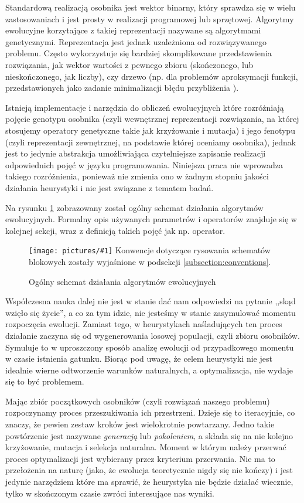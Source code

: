 \documentclass[twoside]{iisthesis}
\newcommand{\img}[1]{\texttt{[image: pictures/\#1]}}
\begin{document}
Standardową realizacją osobnika jest wektor binarny, który sprawdza się w wielu zastosowaniach i jest prosty w realizacji programowej lub sprzętowej. 
Algorytmy ewolucyjne korzytające z takiej reprezentacji nazywane są algorytmami genetycznymi. 
Reprezentacja jest jednak uzależniona od rozwiązywanego problemu. 
Często wykorzystuje się bardziej skomplikowane przedstawienia rozwiązania, jak wektor wartości z pewnego zbioru (skończonego, lub nieskończonego, jak liczby), czy drzewo \cite{gen_prog} (np. dla problemów aproksymacji funkcji, przedstawionych jako zadanie minimalizacji błędu przybliżenia \cite{gen_prog_foo_approx}).

Istnieją implementacje i narzędzia do obliczeń ewolucyjnych które rozróżniają pojęcie genotypu osobnika (czyli wewnętrznej reprezentacji rozwiązania, na której stosujemy operatory genetyczne takie jak krzyżowanie i mutacja) i jego fenotypu (czyli reprezentacji zewnętrznej, na podstawie której oceniamy osobnika), jednak jest to jedynie abstrakcja umożliwiająca czytelniejsze zapisanie realizacji odpowiednich pojęć w języku programowania. Niniejsza praca nie wprowadza takiego rozróżnienia, ponieważ nie zmienia ono w żadnym stopniu jakości działania heurystyki i nie jest związane z tematem badań.

Na rysunku \ref{figure:ea_general} zobrazowany został ogólny schemat działania algorytmów ewolucyjnych. Formalny opis używanych parametrów i operatorów znajduje się w kolejnej sekcji, wraz z definicją takich pojęć jak np. operator.

\begin{figure}
	\caption{Ogólny schemat działania algorytmów ewolucyjnych
		\label{figure:ea_general}
		}
	\img{ea_general.png}
	Konwencje dotyczące rysowania schematów blokowych zostały wyjaśnione w podsekcji \ref{subsection:conventions}.
\end{figure}

Współczesna nauka dalej nie jest w stanie dać nam odpowiedzi na pytanie ,,skąd wzięło się życie'', a co za tym idzie, nie jesteśmy w stanie zasymulować momentu rozpoczęcia ewolucji.
Zamiast tego, w heurystykach naśladujących ten proces działanie zaczyna się od wygenerowania losowej populacji, czyli zbioru osobników. 
Symuluje to w uproszczony sposób analizę ewolucji od przypadkowego momentu w czasie istnienia gatunku.
Biorąc pod uwagę, że celem heurystyki nie jest idealnie wierne odtworzenie warunków naturalnych, a optymalizacja, nie wydaje się to być problemem.

Mając zbiór początkowych osobników (czyli rozwiązań naszego problemu) rozpoczynamy proces przeszukiwania ich przestrzeni.
Dzieje się to iteracyjnie, co znaczy, że pewien zestaw kroków jest wielokrotnie powtarzany.
Jedno takie powtórzenie jest nazywane \emph{generacją} lub \emph{pokoleniem}, a składa się na nie kolejno krzyżowanie, mutacja i selekcja naturalna.
Moment w którym należy przerwać proces optymalizacji jest wybierany przez kryterium przerwania. 
Nie ma to przełożenia na naturę (jako, że ewolucja teoretycznie nigdy się nie kończy) i jest jedynie narzędziem które ma sprawić, że heurystyka nie będzie działać wiecznie, tylko w skończonym czasie zwróci interesujące nas wyniki.
\end{document}
